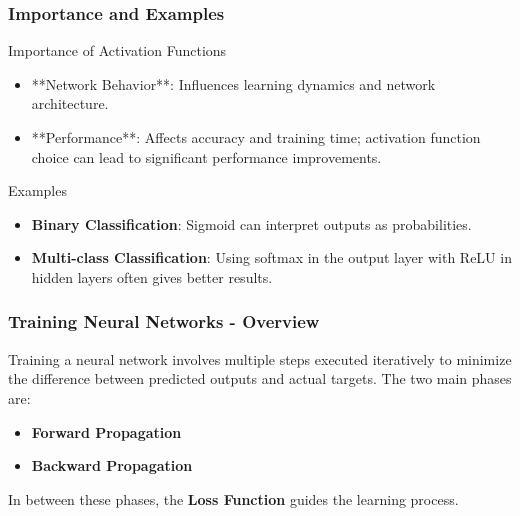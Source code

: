 \documentclass[aspectratio=169]{beamer}
\begin{document}
\begin{frame}[fragile]
    \frametitle{Importance and Examples}
    \begin{block}{Importance of Activation Functions}
        \begin{itemize}
            \item **Network Behavior**: Influences learning dynamics and network architecture.
            \item **Performance**: Affects accuracy and training time; activation function choice can lead to significant performance improvements.
        \end{itemize}
    \end{block}

    \begin{block}{Examples}
        \begin{itemize}
            \item \textbf{Binary Classification}: Sigmoid can interpret outputs as probabilities.
            \item \textbf{Multi-class Classification}: Using softmax in the output layer with ReLU in hidden layers often gives better results.
        \end{itemize}
    \end{block}
\end{frame}

\begin{frame}[fragile]
  \frametitle{Training Neural Networks - Overview}
  Training a neural network involves multiple steps executed iteratively to minimize the difference between predicted outputs and actual targets. The two main phases are:
  \begin{itemize}
    \item \textbf{Forward Propagation}
    \item \textbf{Backward Propagation}
  \end{itemize}
  In between these phases, the \textbf{Loss Function} guides the learning process.
\end{frame}
\end{document}
